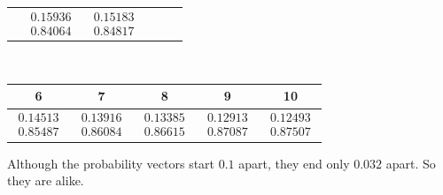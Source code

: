 \begin{ans}{5}
\begin{exparts}
\begin{center}
\begin{tabular}{c|ccccc}
               &$\begin{array}{c}   0.15936 \\ 0.84064 \end{array}$
               &$\begin{array}{c}   0.15183 \\ 0.84817 \end{array}$
             \end{tabular}                                         \\[1ex]
             \begin{tabular}{|ccccc}
               6  &7  &8  &9 &10 \\
               \hline
               $\begin{array}{c}  0.14513 \\ 0.85487  \end{array}$
               &$\begin{array}{c}  0.13916 \\ 0.86084  \end{array}$
               &$\begin{array}{c}  0.13385 \\ 0.86615  \end{array}$
               &$\begin{array}{c}  0.12913 \\ 0.87087  \end{array}$
               &$\begin{array}{c}  0.12493 \\ 0.87507  \end{array}$
             \end{tabular}
           \end{center}
          \partsitem Although the probability vectors start $0.1$ apart,
            they end only $0.032$ apart.
            So they are alike.
       \end{exparts}
     
\end{ans}
